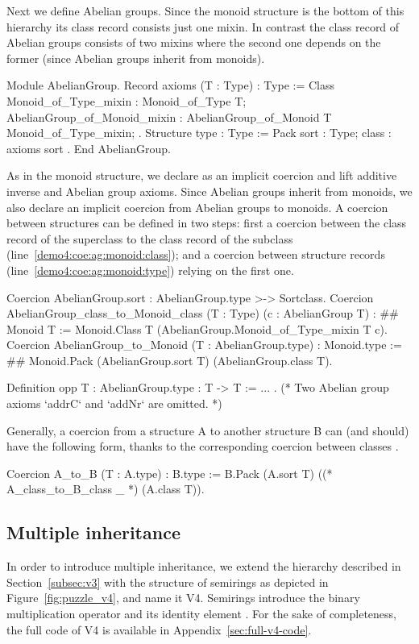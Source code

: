 \documentclass[a4paper,UKenglish,cleveref, autoref]{lipics-v2019}
\newcommand{\mixin}{mixin}
\newcommand{\mixins}{mixins}
\theoremstyle{implem}
\theoremstyle{implem}
\theoremstyle{command}
\theoremstyle{commands}
\begin{document}
Next we define Abelian groups.
Since the monoid structure is the bottom of this hierarchy its class record
 consists just one \mixin{}. In contrast the class record
of Abelian groups consists of two \mixins{} where the second one depends
 on the former (since Abelian groups inherit from monoids).
\begin{coqcode}
Module AbelianGroup.
Record axioms (T : Type) : Type := Class {
  Monoid_of_Type_mixin : Monoid_of_Type T;
  AbelianGroup_of_Monoid_mixin : AbelianGroup_of_Monoid T Monoid_of_Type_mixin; }.
Structure type : Type := Pack { sort : Type; class : axioms sort }.
End AbelianGroup.
\end{coqcode}
As in the monoid structure, we declare  as an implicit
coercion and lift additive inverse  and Abelian group axioms.
Since Abelian groups inherit from monoids, we also declare an implicit coercion
from Abelian groups to monoids. A coercion between structures can be defined
in two steps: first a coercion between the class record of the
superclass to the class record of the subclass (line~\ref{demo4:coe:ag:monoid:class});
and a coercion between
structure records (line~\ref{demo4:coe:ag:monoid:type}) relying on the first one.
\begin{coqcode}
Coercion AbelianGroup.sort : AbelianGroup.type >-> Sortclass.
Coercion AbelianGroup_class_to_Monoid_class (T : Type) (c : AbelianGroup T) : #\label{demo4:coe:ag:monoid:class}#
  Monoid T := Monoid.Class T (AbelianGroup.Monoid_of_Type_mixin T c).
Coercion AbelianGroup_to_Monoid (T : AbelianGroup.type) : Monoid.type := #\label{demo4:coe:ag:monoid:type}#
  Monoid.Pack (AbelianGroup.sort T) (AbelianGroup.class T).

Definition opp {T : AbelianGroup.type} : T -> T := ... .
(* Two Abelian group axioms `addrC` and `addNr` are omitted. *)
\end{coqcode}

Generally, a coercion from a structure A to another structure B can (and should) have the following form, thanks to the corresponding coercion between classes .
\begin{coqcode}
Coercion A_to_B (T : A.type) : B.type :=
  B.Pack (A.sort T) ((* A_class_to_B_class _ *) (A.class T)).
\end{coqcode}

\subsection{Multiple inheritance}
In order to introduce multiple inheritance, we extend the hierarchy described in
Section~\ref{subsec:v3} with the structure of semirings %
as depicted in Figure~\ref{fig:puzzle_v4}, and name it V4. Semirings introduce the
binary multiplication operator  and its identity element
.  For the sake of completeness, the full code of V4 is available in
Appendix~\ref{sec:full-v4-code}.
\end{document}
